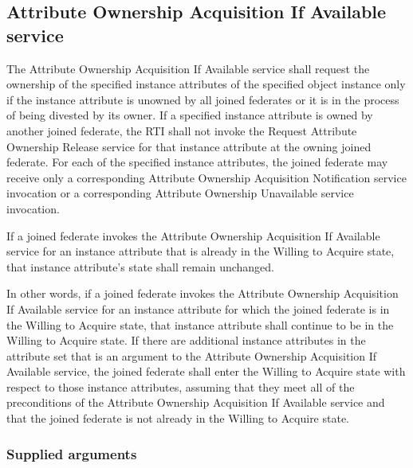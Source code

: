 \begin{compactstdpage}

    \subsection{Attribute Ownership Acquisition If Available service}


    The Attribute Ownership Acquisition If Available service shall request the ownership of the specified instance attributes of the specified object instance only if the instance attribute is unowned by all joined federates or it is in the process of being divested by its owner. If a specified instance attribute is owned by another joined federate, the RTI shall not invoke the Request Attribute Ownership Release \rtiinitiated{} service for that instance attribute at the owning joined federate. For each of the specified instance attributes, the joined federate may receive only a corresponding Attribute Ownership Acquisition Notification \rtiinitiated{} service invocation or a corresponding Attribute Ownership Unavailable \rtiinitiated{} service invocation.


    If a joined federate invokes the Attribute Ownership Acquisition If Available service for an instance attribute that is already in the Willing to Acquire state, that instance attribute's state shall remain unchanged.


    In other words, if a joined federate invokes the Attribute Ownership Acquisition If Available service for an instance attribute for which the joined federate is in the Willing to Acquire state, that instance attribute shall continue to be in the Willing to Acquire state. If there are additional instance attributes in the attribute set that is an argument to the Attribute Ownership Acquisition If Available service, the joined federate shall enter the Willing to Acquire state with respect to those instance attributes, assuming that they meet all of the preconditions of the Attribute Ownership Acquisition If Available service and that the joined federate is not already in the Willing to Acquire state.

    \subsubsection{Supplied arguments}




\end{compactstdpage}
